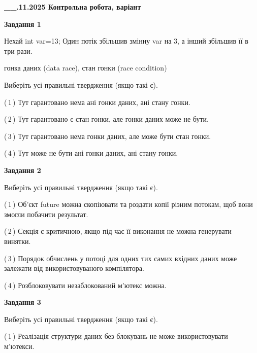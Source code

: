 \documentclass[12pt, ukrainian]{article}
\begin{document}
\begin {large}

\textbf{\_\_.11.2025 Контрольна робота, варіант  }\par


{

\begin{center}
\textbf{Завдання 1}
\end{center}
Нехай int var=13; Один потік збільшив змінну var на 3, а інший збільшив її в три рази.

гонка даних (data race), стан гонки (race condition)

Виберіть усі правильні твердження (якщо такі є).\par
\vspace{2mm}
(\,1\,) Тут гарантовано нема ані гонки даних, ані стану гонки.%

(\,2\,) Тут гарантовано є стан гонки, але гонки даних може не бути.%

(\,3\,) Тут гарантовано нема гонки даних, але може бути стан гонки.%

(\,4\,) Тут може не бути ані гонки даних, ані стану гонки.%



\begin{center}
\textbf{Завдання 2}
\end{center}
Виберіть усі правильні твердження (якщо такі є).\par
\vspace{2mm}

(\,1\,) Об’єкт future можна скопіювати та роздати копії різним потокам, щоб вони змогли побачити результат.%

(\,2\,) Секція є критичною, якщо під час її виконання не можна генерувати винятки.%

(\,3\,) Порядок обчислень у потоці для одних тих самих вхідних даних може залежати від використовуваного компілятора.%

(\,4\,) Розблоковувати незаблокований м’ютекс можна.%



\begin{center}
\textbf{Завдання 3}
\end{center}
Виберіть усі правильні твердження (якщо такі є).\par
\vspace{2mm}

(\,1\,) Реалізація структури даних без блокувань не може використовувати м’ютекси.%

}
\end{large}
\end{document}
